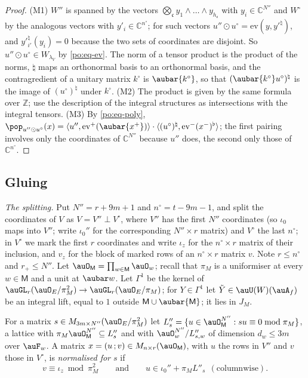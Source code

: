 \documentclass[10pt]{amsart}
\theoremstyle{definition}
\theoremstyle{remark}
\newcommand{\C}{\mathbb C}
\newcommand{\Z}{\mathbb Z}
\begin{document}
\begin{proof}
(M1) $W''$ is spanned by the vectors $\bigotimes_{\mathfrak c}y_1\wedge\dots\wedge y_{h_{\mathfrak
c}}$ with $y_i\in\C^{N''}$ and $W^\circ$ by the analogous vectors with $y'_i\in\C^{n^\circ}$; for
such vectors $u''\odot u^\circ=\mathrm{ev}(y,y'^\natural)$, and $y'^\natural_{i'}(y_i)=0$ because
the two sets of coordinates are disjoint. So $u''\odot u^\circ\in W_{\lambda_V}$ by
\eqref{po:eq-ev}. The norm of a tensor product is the product of the norms, $\natural$ maps an
orthonormal basis to an orthonormal basis, and the contragredient of a unitary matrix $k^\circ$
is $\aubar{k^\circ}$, so that $(\aubar{k^\circ}u^\circ)^\natural$ is the image of
$(u^\circ)^\natural$ under $k^\circ$. (M2) The product is given by the same formula over $\Z$;
use the description of the integral structures as intersections with the integral tensors.
(M3) By \eqref{po:eq-poly}, $\pop_{u''\odot u^\circ}(x)=\langle u'',\mathrm{ev}^+(\aubar{x^+})\rangle
\cdot\langle(u^\circ)^\natural,\mathrm{ev}^-(x^-)^\flat\rangle$; the first pairing involves only the
coordinates of $\C^{N''}$ because $u''$ does, the second only those of $\C^{n^\circ}$.
\end{proof}

\subsection{Gluing}\label{po:ss-glue}

\emph{The splitting.} Put $N''=r+9m+1$ and $n^\circ=t-9m-1$, and split the coordinates of $V$ as
$V=V''\perp V^\circ$, where $V''$ has the first $N''$ coordinates (so $\iota_0$ maps into $V''$;
write $\iota_0''$ for the corresponding $N''\times r$ matrix) and $V^\circ$ the last $n^\circ$; in
$V^\circ$ we mark the first $r$ coordinates and write $\iota_z$ for the $n^\circ\times r$ matrix
of their inclusion, and $v_z$ for the block of marked rows of an $n^\circ\times r$ matrix $v$. Note
$r\le n^\circ$ and $r_+\le N''$. Let $\auO_{\mathsf M}=\prod_{w\in\mathsf M}\auO_w$; recall that
$\pi_M$ is a uniformiser at every $w\in\mathsf M$ and a unit at $\aubar w$. Let $\Gamma^1$ be the
kernel of $\auGL_r(\auO_E/\pi_M^2)\to\auGL_r(\auO_E/\pi_M)$; for $Y\in\Gamma^1$ let
$\tilde Y\in\auU(W)(\auA_f)$ be an integral lift, equal to $1$ outside $\mathsf M\cup
\aubar{\mathsf M}$; it lies in $J_M$.

For a matrix $s\in M_{3m\times N''}(\auO_E/\pi_M^2)$ let $L''_s=\{u\in\auO_{\mathsf M}^{N''}:
su\equiv0\bmod\pi_M\}$, a lattice with $\pi_M\auO_{\mathsf M}^{N''}\subseteq L''_s$ and with
$\auO_w^{N''}/L''_{s,w}$ of dimension $d_w\le3m$ over $\auF_w$. A matrix $x=(u\,;v)\in
M_{n\times r}(\auO_{\mathsf M})$, with $u$ the rows in $V''$ and $v$ those in $V^\circ$, is
\emph{normalised for $s$} if
\[
v\equiv\iota_z\bmod\pi_M^2\qquad\text{and}\qquad u\in\iota_0''+\pi_ML''_s\ \ (\text{columnwise}).
\]
\end{document}
